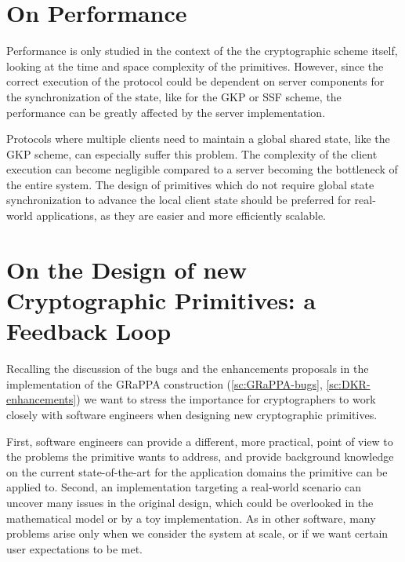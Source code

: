 \section{On Performance}\label{sc:gap-performance}

Performance is only studied in the context of the
the cryptographic scheme itself, looking at the time and
space complexity of the primitives.
However, since the correct execution of the protocol
could be dependent on server components for the synchronization
of the state, like for the GKP or SSF scheme, the performance
can be greatly affected by the server implementation.

Protocols where multiple clients need to maintain
a global shared state, like the GKP scheme, can especially
suffer this problem. The complexity of the client
execution can become negligible compared to a server
becoming the bottleneck of the entire system.
The design of primitives which do not require 
global state synchronization to advance the local
client state should be preferred
for real-world applications, as they are easier 
and more efficiently scalable.



\section{On the Design of new Cryptographic Primitives: a Feedback Loop}\label{sc:collaboration-crypto-se}

Recalling the discussion of the bugs and the enhancements 
proposals in the implementation of the GRaPPA construction
(\cref{sc:GRaPPA-bugs}, \cref{sc:DKR-enhancements})
we want to stress the importance for
cryptographers to work closely with software engineers
when designing new cryptographic primitives.

First, software engineers can provide a different, more
practical, point of view to the problems the primitive
wants to address, and provide background knowledge
on the current state-of-the-art for the application
domains the primitive can be applied to.
Second, an implementation targeting a real-world scenario
can uncover many issues in the original design, which could be
overlooked in the mathematical model or by a toy implementation.
As in other software, many problems arise only when
we consider the system at scale, or if we want certain
user expectations to be met.

